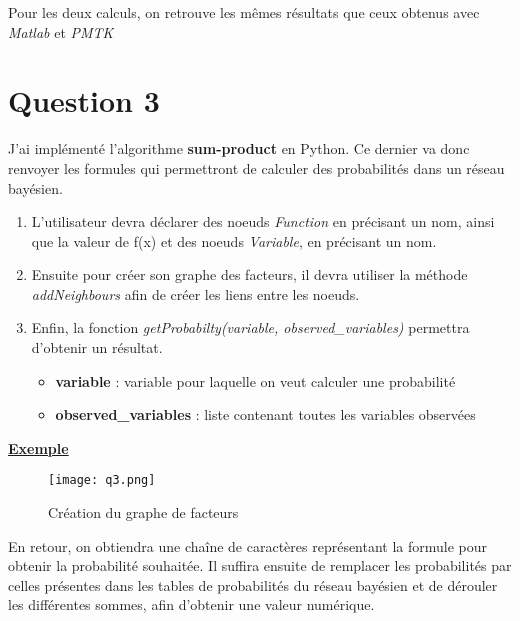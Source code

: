 \documentclass[12pt]{article}
\begin{document}
Pour les deux calculs, on retrouve les mêmes résultats que ceux obtenus avec \textit{Matlab} et \textit{PMTK}

\section{Question 3}
J'ai implémenté l'algorithme \textbf{sum-product} en Python. Ce dernier va donc renvoyer les formules qui permettront de calculer des probabilités dans un réseau bayésien.
\begin{enumerate}
\item L'utilisateur devra déclarer des noeuds \textit{Function} en précisant un nom, ainsi que la valeur de f(x) et des noeuds \textit{Variable}, en précisant un nom.

\item Ensuite pour créer son graphe des facteurs, il devra utiliser la méthode \textit{addNeighbours} afin de créer les liens entre les noeuds.

\item Enfin, la fonction \textit{getProbabilty(variable, observed\_variables)} permettra d'obtenir un résultat.
\begin{itemize}
\item \textbf{variable} : variable pour laquelle on veut calculer une probabilité 
\item \textbf{observed\_variables} : liste contenant toutes les variables observées
\\ \linebreak
\end{itemize}
\end{enumerate}

\textbf{\underline{Exemple}}
\begin{figure}[H]
\begin{center}
	\texttt{[image: q3.png]}
	\caption{Création du graphe de facteurs}
	\label{fig:Exemple}
\end{center}
\end{figure}

En retour, on obtiendra une chaîne de caractères représentant la formule pour obtenir la probabilité souhaitée. Il suffira ensuite de remplacer les probabilités par celles présentes dans les tables de probabilités du réseau bayésien et de dérouler les différentes sommes, afin d'obtenir une valeur numérique.
\end{document}
